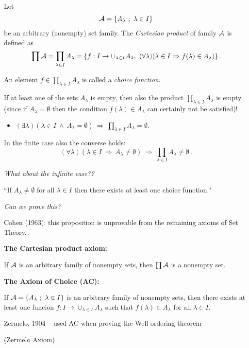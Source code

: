\documentclass[11pt,paper=b5,footinclude,headinclude]{scrbook} %
\def\inn {{~\wedge~}}
\def\sledi {{~\Rightarrow~}}
\theoremstyle{remark}
\theoremstyle{definition} %
\theoremstyle{theorem} %
\begin{document}
Let
$${\cal A}=\{A_{\lambda}~;~\lambda\in I\}$$
be an arbitrary (nonempty) set family.
The {\em Cartesian product} of family ${\cal A}$ is defined as
$$\prod{\cal A} = \prod_{\lambda\in I}A_\lambda = \{f:I\to\cup_{\lambda\in I}A_\lambda,~(\forall\lambda)(\lambda\in I\sledi f(\lambda)\in A_\lambda)\}\,.$$

An element
$f\in \prod_{\lambda\in I}A_\lambda$ is called a {\em choice function}.

If at least one of the sets $A_\lambda$ is empty, then also the product $\prod_{\lambda\in I}A_\lambda$
is empty (since if  $A_\lambda = \emptyset$ then the condition $f(\lambda) \in A_\lambda$ can certainly not be satisfied)!

\begin{itemize}
  \item $(\exists \lambda)(\lambda\in I\inn A_\lambda = \emptyset)\sledi \prod_{\lambda\in I}A_\lambda=\emptyset$.
\end{itemize}

In the finite case also the converse holds:
$$(\forall \lambda)(\lambda\in I\sledi A_\lambda\neq\emptyset)\sledi
      \prod_{\lambda\in I}A_\lambda\neq\emptyset\,.$$

{\em What about the infinite case??}

``If $A_\lambda\neq \emptyset$ for all $\lambda\in I$ then there exists at least one choice function."~

{\em Can we prove this?}

Cohen (1963): this proposition is unprovable from the remaining axioms of Set Theory.

\bigskip
\textbf{ The Cartesian product axiom:}

If ${\cal A}$ is an arbitrary family of nonempty sets, then $\prod {\cal A}$ is a nonempty set.

\bigskip
\textbf{ The Axiom of Choice (AC):}

If  ${\cal A} = \{A_\lambda~;~\lambda\in I\}$ is an arbitrary family of nonempty sets,
then there exists at least one funcion $f:I\to \cup_{\lambda \in I}A_\lambda$
such that
$f(\lambda)\in A_\lambda$ for all $\lambda\in I$.

Zermelo, 1904 -- used AC when proving the Well ordering theorem

(Zermelo Axiom)


\bigskip
\end{document}
